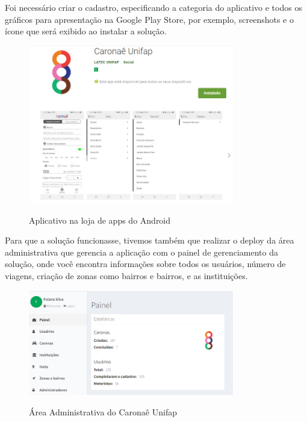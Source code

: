 Foi necessário criar o cadastro, especificando a categoria do aplicativo e todos os gráficos para apresentação na Google Play Store, por exemplo, screenshots e o ícone que será exibido ao instalar a solução.

\begin{figure}[H]
	\centering
	\caption{Aplicativo na loja de apps do Android}
	\includegraphics[width=0.8\textwidth]{./04-figuras/googleplay/googleplay.png}
	\label{fig:googleplay}
\end{figure}

Para que a solução funcionasse, tivemos também que realizar o deploy da área administrativa que gerencia a aplicação com o painel de gerenciamento da solução, onde você encontra informações sobre todos os usuários, número de viagens, criação de zonas como bairros e bairros, e as instituições.

\begin{figure}[H]
	\centering
	\caption{Área Administrativa do Caronaê Unifap}
	\includegraphics[width=0.8\textwidth]{./04-figuras/area-administrativa/painel_inicial.png}
	\label{fig:area-administrativa}
\end{figure}

